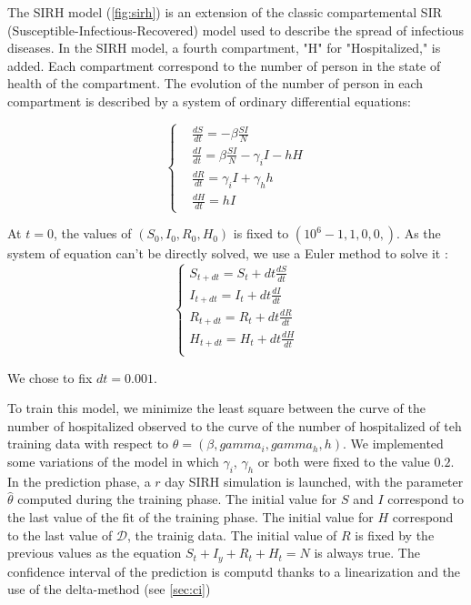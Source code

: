 The SIRH model (\ref*{fig:sirh}) is an extension of the classic compartemental SIR (Susceptible-Infectious-Recovered) model used to describe the spread of infectious diseases.
In the SIRH model, a fourth compartment, "H" for "Hospitalized," is added. 
Each compartment correspond to the number of person in the state of health of the compartment. 
The evolution of the number of person in each compartment is described by a system of ordinary differential equations: 

\begin{equation}
    \left\{
    \begin{aligned}
        &\frac{dS}{dt} = - \beta \frac{SI}{N} \\
        &\frac{dI}{dt} = \beta \frac{SI}{N} - \gamma_i I - h H \\
        &\frac{dR}{dt} = \gamma_i I + \gamma_h h \\
        &\frac{dH}{dt} = h I
    \end{aligned}
    \right.
\end{equation}

At $t=0$, the values of $(S_0, I_0, R_0, H_0)$ is fixed to $(10^6 -1, 1, 0, 0,) $. 
As the system of equation can't be directly solved, we use a Euler method to solve it : \\


\begin{equation}
    \left\{
    \begin{aligned}
        S_{t+dt}=S_t + dt \frac{dS}{dt}\\
        I_{t+dt}=I_t + dt \frac{dI}{dt}\\
        R_{t+dt}=R_t + dt \frac{dR}{dt}\\
        H_{t+dt}=H_t + dt \frac{dH}{dt}\\
    \end{aligned}
    \right.
\end{equation}


We chose to fix $dt=0.001$. 




To train this model, we minimize the least square between the curve of the number of hospitalized observed to the curve of the number of hospitalized of teh training data with respect to $\theta = (\beta, gamma_i, gamma_h, h)$. 
We implemented some variations of the model in which $\gamma_i$, $\gamma_h$ or both were fixed to the value $0.2$. 
In the prediction phase, a $r$ day SIRH simulation is launched, with the parameter $\hat{\theta}$ computed during the training phase. 
The initial value for $S$ and $I$ correspond to the last value of the fit of the training phase. 
The initial value for $H$ correspond to the last value of $\mathcal{D}$, the trainig data. 
The initial value of $R$ is fixed by the previous values as the equation $S_t + I_y + R_t + H_t = N$ is always true. 
The confidence interval of the prediction is computd thanks to a linearization and the use of the delta-method (see \ref{sec:ci})


